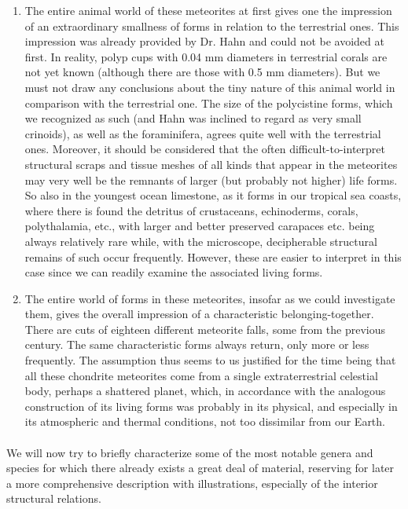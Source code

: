\documentclass[a4paper, 12pt, oneside]{article}
\begin{document}
\begin{enumerate}
\item The entire animal world of these meteorites at first gives one the impression of an extraordinary smallness of forms in relation to the terrestrial ones. This impression was already provided by Dr. Hahn and could not be avoided at first. In reality, polyp cups with 0.04 mm diameters in terrestrial corals are not yet known (although there are those with 0.5 mm diameters). But we must not draw any conclusions about the tiny nature of this animal world in comparison with the terrestrial one. The size of the polycistine forms, which we recognized as such (and Hahn was inclined to regard as very small crinoids), as well as the foraminifera, agrees quite well with the terrestrial ones. Moreover, it should be considered that the often difficult-to-interpret structural scraps and tissue meshes of all kinds that appear in the meteorites may very well be the remnants of larger (but probably not higher) life forms. So also in the youngest ocean limestone, as it forms in our tropical sea coasts, where there is found the detritus of crustaceans, echinoderms, corals, polythalamia, etc., with larger and better preserved carapaces etc. being always relatively rare while, with the microscope, decipherable structural remains of such occur frequently. However, these are easier to interpret in this case since we can readily examine the associated living forms.

\item The entire world of forms in these meteorites, insofar as we could investigate them, gives the overall impression of a characteristic belonging-together. There are cuts of eighteen different meteorite falls, some from the previous century. The same characteristic forms always return, only more or less frequently. The assumption thus seems to us justified for the time being that all these chondrite meteorites come from a single extraterrestrial celestial body, perhaps a shattered planet, which, in accordance with the analogous construction of its living forms was probably in its physical, and especially in its atmospheric and thermal conditions, not too dissimilar from our Earth.
\end{enumerate}
\paragraph{}
We will now try to briefly characterize some of the most notable genera and species for which there already exists a great deal of material, reserving for later a more comprehensive description with illustrations, especially of the interior structural relations.
\clearpage
\end{document}
